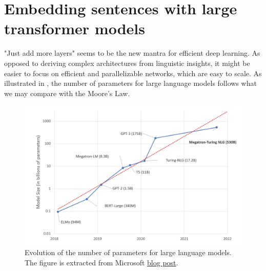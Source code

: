 \chapter{Embedding sentences with large transformer models}





"Just add more layers" seems to be the new mantra for efficient deep learning. As opposed to deriving complex architectures from linguistic insights, it might be easier to focus on efficient and parallelizable networks, which are easy to scale. As illustrated in , the number of parameters for large language models follows what we may compare with the Moore's Law.

\begin{figure}[htb!]
	\includegraphics[width=\textwidth]{images/model-size-graph.jpeg}
	\caption[Large models number of parameters]{Evolution of the number of parameters for large language models. The figure is extracted from Microsoft \href{https://www.microsoft.com/en-us/research/blog/using-deepspeed-and-megatron-to-train-megatron-turing-nlg-530b-the-worlds-largest-and-most-powerful-generative-language-model/}{blog post}.}
\end{figure}

